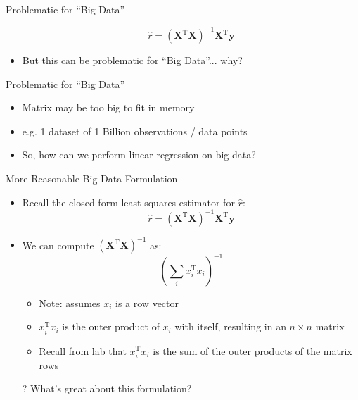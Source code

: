 \documentclass[aspectratio=169]{beamer}
\begin{document}
\begin{frame}{Problematic for ``Big Data''}

\begin{itemize}
	\item[] 			$$\hat{r} = (\textbf{X}^{\textrm{T}}\textbf{X})^{-1}\textbf{X}^{\textrm{T}}\textbf{y}$$
	\item But this can be problematic for ``Big Data''... why?
\end{itemize}
\end{frame}
\begin{frame}{Problematic for ``Big Data''}

\begin{itemize}
		\item Matrix may be too big to fit in memory
		\item e.g. 1 dataset of 1 Billion observations / data points
		\vspace{5em}
		\item So, how can we perform linear regression on big data?
\end{itemize}
\end{frame}
\begin{frame}{More Reasonable Big Data Formulation}

\begin{itemize}
\item Recall the closed form least squares estimator for $\hat{r}$:
			$$\hat{r} = (\textbf{X}^{\textrm{T}}\textbf{X})^{-1}\textbf{X}^{\textrm{T}}\textbf{y}$$
	\item We can compute $(\textbf{X}^{\textrm{T}}\textbf{X})^{-1}$ as:
		$$\left( \sum_i x_i^{\textrm{T}} x_i \right)^{-1}$$
		\begin{itemize}
			\item Note: assumes $x_i$ is a row vector
			\item $ x_i^{\textrm{T}} x_i $ is the outer product of $x_i$ with itself, resulting in an $n\times n$ matrix
			\item Recall from lab that $x_i^{\textrm{T}} x_i$ is the sum of the outer products of the matrix rows
		\end{itemize}
	\item[?] What's great about this formulation?
\end{itemize}
\end{frame}
\end{document}
